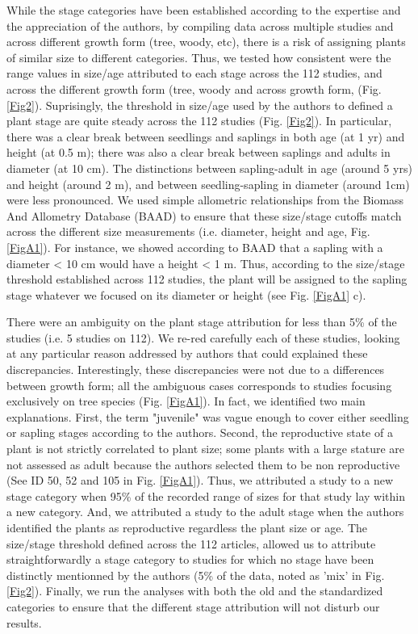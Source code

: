 \documentclass[a4paper]{article}\usepackage[]{graphicx}\usepackage[]{color}
\begin{document}
While the stage categories have been established according to the expertise and the appreciation of the authors, by compiling data across multiple studies and across different growth form (tree, woody, etc), there is a risk of assigning plants of similar size to different categories. Thus, we tested how consistent were the range values in size/age attributed to each stage across the 112 studies, and across the different growth form (tree, woody and across growth form, (Fig. \ref{Fig2}). Suprisingly, the threshold in size/age used by the authors to defined a plant stage are quite steady across the 112 studies (Fig. \ref{Fig2}). In particular, there was a clear break between seedlings and saplings in both age (at 1 yr) and height (at 0.5 m); there was also a clear break between saplings and adults in diameter (at 10 cm). The distinctions between sapling-adult in age (around 5 yrs) and height (around 2 m), and between seedling-sapling in diameter (around 1cm) were less pronounced. We used simple allometric relationships from the Biomass And Allometry Database (BAAD) \citep{Falster:2015} to ensure that these size/stage cutoffs match across the different size measurements (i.e. diameter, height and age, Fig. \ref{FigA1}). For instance, we showed according to BAAD that a sapling with a diameter < 10 cm would have a height < 1 m. Thus, according to the size/stage threshold established across 112 studies, the plant will be assigned to the sapling stage whatever we focused on its diameter or height (see Fig. \ref{FigA1} c).

There were an ambiguity on the plant stage attribution for less than 5\% of the studies (i.e. 5 studies on 112). We re-red carefully each of these studies, looking at any particular reason addressed by authors that could explained these discrepancies. Interestingly, these discrepancies were not due to a differences between growth form; all the ambiguous cases corresponds to studies focusing exclusively on tree species (Fig. \ref{FigA1}). In fact, we identified two main explanations. First, the term "juvenile" was vague enough to cover either seedling or sapling stages according to the authors. Second, the reproductive state of a plant is not strictly correlated to plant size; some plants with a large stature are not assessed as adult because the authors selected them to be non reproductive (See ID 50, 52 and 105 in Fig. \ref{FigA1}). Thus, we attributed a study to a new stage category when 95\% of the recorded range of sizes for that study lay within a new category. And, we attributed a study to the adult stage when the authors identified the plants as reproductive regardless the plant size or age. The size/stage threshold defined across the 112 articles, allowed us to attribute straightforwardly a stage category to studies for which no stage have been distinctly mentionned by the authors (5\% of the data, noted as 'mix' in Fig. \ref{Fig2}). Finally, we run the analyses with both the old and the standardized categories to ensure that the different stage attribution will not disturb our results. 
\end{document}

